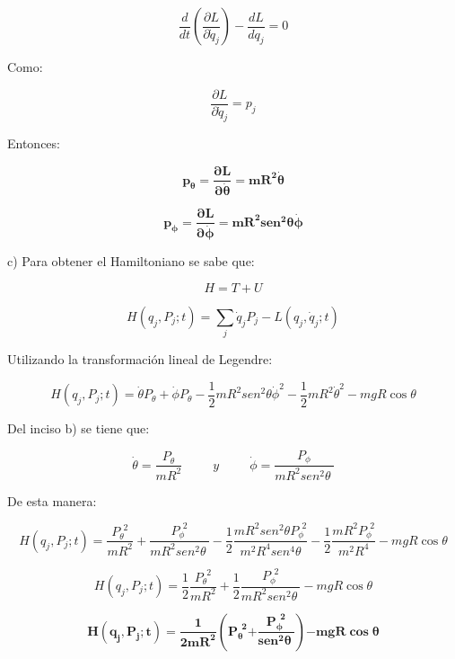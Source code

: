 \documentclass[]{article}
\begin{document}
\[\frac{d}{dt}\left( \frac{\partial L}{\partial{\dot{q}}_{j}} \right) - \frac{dL}{dq_{j}} = 0\]

Como:

\[\frac{\partial L}{\partial{\dot{q}}_{j}} = p_{j}\]

Entonces:

\[\mathbf{p}_{\mathbf{\theta}}\mathbf{=}\frac{\mathbf{\partial L}}{\mathbf{\partial}\dot{\mathbf{\theta}}}\mathbf{= m}\mathbf{R}^{\mathbf{2}}\dot{\mathbf{\theta}}\]

\[\mathbf{p}_{\mathbf{\phi}}\mathbf{=}\frac{\mathbf{\partial L}}{\mathbf{\partial}\dot{\mathbf{\phi}}}\mathbf{= m}\mathbf{R}^{\mathbf{2}}{\mathbf{se}\mathbf{n}^{\mathbf{2}}}\mathbf{\theta}\dot{\mathbf{\phi}}\]

c) Para obtener el Hamiltoniano se sabe que:

\[H = T + U\]

\[H\left( q_{j},P_{j};t \right) = \sum_{j}^{}{{\dot{q}}_{j}P_{j} - L\left( q_{j},{\dot{q}}_{j};t \right)}\]

Utilizando la transformación lineal de Legendre:

\[H\left( q_{j},P_{j};t \right) = \dot{\theta}P_{\theta} + \dot{\phi}P_{\theta} - \frac{1}{2}mR^{2}{sen}^{2}\theta{\dot{\phi}}^{2} - \frac{1}{2}mR^{2}{\dot{\theta}}^{2} - mgR\cos\theta\]

Del inciso b) se tiene que:

\[\dot{\theta} = \frac{P_{\theta}}{mR^{2}}\ \ \ \ \ \ \ \ \ \ \ y\ \ \ \ \ \ \ \ \ \ \ \dot{\phi} = \frac{P_{\phi}}{mR^{2}{sen}^{2}\theta\ }\]

De esta manera:

\[H\left( q_{j},P_{j};t \right) = \frac{P_{\theta}^{\ \ 2}}{mR^{2}} + \frac{P_{\phi}^{\ \ 2}}{mR^{2}{sen}^{2}\theta\ } - \frac{1}{2}\frac{mR^{2}{sen}^{2}\theta P_{\phi}^{\ \ 2}}{m^{2}R^{4}{sen}^{4}\theta} - \frac{1}{2}\frac{mR^{2}P_{\phi}^{\ \ 2}}{m^{2}R^{4}} - mgR\cos\theta\]

\[H\left( q_{j},P_{j};t \right) = \frac{1}{2}\frac{P_{\theta}^{\ \ 2}}{mR^{2}} + \frac{1}{2}\frac{P_{\phi}^{\ \ 2}}{mR^{2}{sen}^{2}\theta\ } - mgR\cos\theta\]

\[\mathbf{H}\left( \mathbf{q}_{\mathbf{j}}\mathbf{,}\mathbf{P}_{\mathbf{j}}\mathbf{;t} \right)\mathbf{=}\frac{\mathbf{1}}{\mathbf{2}\mathbf{m}\mathbf{R}^{\mathbf{2}}}\left( \mathbf{P}_{\mathbf{\theta}}^{\mathbf{\ \ 2}}\mathbf{+}\frac{\mathbf{P}_{\mathbf{\phi}}^{\mathbf{\ \ 2}}}{\mathbf{sen}^{\mathbf{2}}\mathbf{\theta}\mathbf{\ }} \right)\mathbf{- mgR}\mathbf{\cos}\mathbf{\theta}\]
\end{document}
